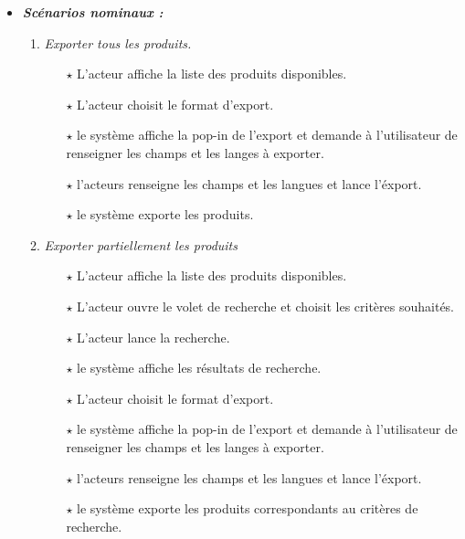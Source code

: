 \begin{itemize}
\begin{itemize}
    \item \textit{\textbf{Scénarios nominaux :}}
         \begin{enumerate}
             \item \textit{Exporter tous les produits.}
                    \begin{itemize}
                        \item[$\star$] L’acteur affiche la liste des produits disponibles.
                       \item[$\star$] L’acteur choisit le format d'export. 
                       \item[$\star$] le système affiche la pop-in de l'export et demande à l'utilisateur de renseigner les champs et les langes à exporter. 
                       \item[$\star$] l'acteurs renseigne les champs et les langues et lance l'éxport.
                       \item[$\star$] le système exporte les produits.
                    \end{itemize}
                \item \textit{Exporter partiellement les produits }
                    \begin{itemize}
                        \item[$\star$] L’acteur affiche la liste des produits disponibles.
                       \item[$\star$] L’acteur ouvre le volet de recherche et choisit les critères souhaités.
                       \item[$\star$] L’acteur lance la recherche.
                       \item[$\star$] le système affiche les résultats de recherche.
                       \item[$\star$] L’acteur choisit le format d'export. 
                       \item[$\star$] le système affiche la pop-in de l'export et demande à l'utilisateur de renseigner les champs et les langes à exporter. 
                       \item[$\star$] l'acteurs renseigne les champs et les langues et lance l'éxport.
                       \item[$\star$] le système exporte les produits correspondants au critères de recherche.
                    \end{itemize}
         \end{enumerate}
    \end{itemize}
    
            \bigskip

\end{itemize}

